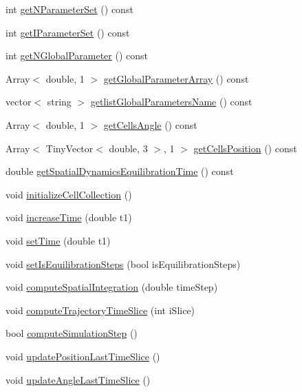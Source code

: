\begin{DoxyCompactItemize}
\item 
int \hyperlink{class_simulator_af9ed84ef1153ebcec61e0c629f07bc31}{get\-N\-Parameter\-Set} () const 
\item 
int \hyperlink{class_simulator_adbebc2a8b4fad6658b3c80ea37ba3fcc}{get\-I\-Parameter\-Set} () const 
\item 
int \hyperlink{class_simulator_af85b8999558e321b94d009f51ca23d63}{get\-N\-Global\-Parameter} () const 
\item 
\-Array$<$ double, 1 $>$ \hyperlink{class_simulator_acb6e9b058f821841e10dd4cf1a006a41}{get\-Global\-Parameter\-Array} () const 
\item 
vector$<$ string $>$ \hyperlink{class_simulator_a31fd30698c9596156e8e2388dde02d11}{getlist\-Global\-Parameters\-Name} () const 
\item 
\-Array$<$ double, 1 $>$ \hyperlink{class_simulator_a2c10cbe98ff0f710e6a15e4a40a8a0f7}{get\-Cells\-Angle} () const 
\item 
\-Array$<$ \-Tiny\-Vector$<$ double, 3 $>$, 1 $>$ \hyperlink{class_simulator_ac13cfded15101afabf0fd2a1d4a275ca}{get\-Cells\-Position} () const 
\item 
double \hyperlink{class_simulator_ac9d7febdac1bb6af0246230516084a85}{get\-Spatial\-Dynamics\-Equilibration\-Time} () const 
\item 
void \hyperlink{class_simulator_a68c747d0d0bf72ed3aae13f1fb256ff9}{initialize\-Cell\-Collection} ()
\item 
void \hyperlink{class_simulator_a46cc81d1c999a6b74dea75d0d3165e5f}{increase\-Time} (double t1)
\item 
void \hyperlink{class_simulator_ae425bfd3eb66830a3aed9e7d8ec2e04c}{set\-Time} (double t1)
\item 
void \hyperlink{class_simulator_a916ddb59f9208acb0dbe40ab2a653a46}{set\-Is\-Equilibration\-Steps} (bool is\-Equilibration\-Steps)
\item 
void \hyperlink{class_simulator_a8efa69757a4cd68534a15faae5a4ab26}{compute\-Spatial\-Integration} (double time\-Step)
\item 
void \hyperlink{class_simulator_a371f9eb358e6c1136e026158741b116e}{compute\-Trajectory\-Time\-Slice} (int i\-Slice)
\item 
bool \hyperlink{class_simulator_a84c7462b37d24779e2c5d08f19640f7d}{compute\-Simulation\-Step} ()
\item 
void \hyperlink{class_simulator_a57d8e3828b486b5be1ab8ff789fe76bb}{update\-Position\-Last\-Time\-Slice} ()
\item 
void \hyperlink{class_simulator_a0d47178b55e8ba22d06c67b0e63b5e86}{update\-Angle\-Last\-Time\-Slice} ()
\end{DoxyCompactItemize}
